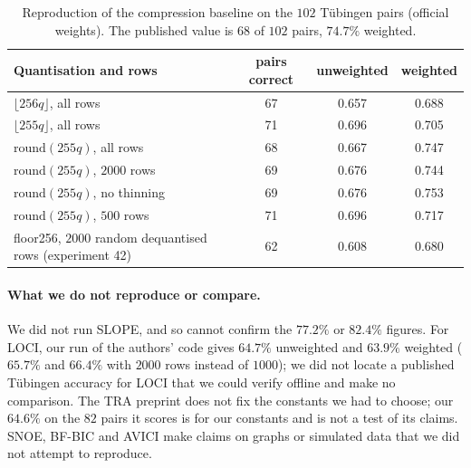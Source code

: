 \begin{table}[t]
\caption{Reproduction of the compression baseline on the $102$ T\"ubingen pairs (official weights). The published value is $68$ of $102$ pairs, $74.7\%$ weighted.}
\label{tab:audit}
\small
\begin{tabular}{@{}lccc@{}}
\toprule
Quantisation and rows & pairs correct & unweighted & weighted\\
\midrule
$\lfloor 256q\rfloor$, all rows & 67 & 0.657 & 0.688\\
$\lfloor 255q\rfloor$, all rows & 71 & 0.696 & 0.705\\
$\mathrm{round}(255q)$, all rows & 68 & 0.667 & 0.747\\
$\mathrm{round}(255q)$, $2000$ rows & 69 & 0.676 & 0.744\\
$\mathrm{round}(255q)$, no thinning & 69 & 0.676 & 0.753\\
$\mathrm{round}(255q)$, $500$ rows & 71 & 0.696 & 0.717\\
floor256, $2000$ random dequantised rows (experiment 42) & 62 & 0.608 & 0.680\\
\bottomrule
\end{tabular}
\end{table}

\paragraph{What we do not reproduce or compare.} We did not run SLOPE, and so cannot confirm the $77.2\%$ or $82.4\%$ figures. For LOCI, our run of the authors' code gives $64.7\%$ unweighted and $63.9\%$ weighted ($65.7\%$ and $66.4\%$ with $2000$ rows instead of $1000$); we did not locate a published T\"ubingen accuracy for LOCI that we could verify offline and make no comparison. The TRA preprint does not fix the constants we had to choose; our $64.6\%$ on the $82$ pairs it scores is for our constants and is not a test of its claims. SNOE, BF-BIC and AVICI make claims on graphs or simulated data that we did not attempt to reproduce.

